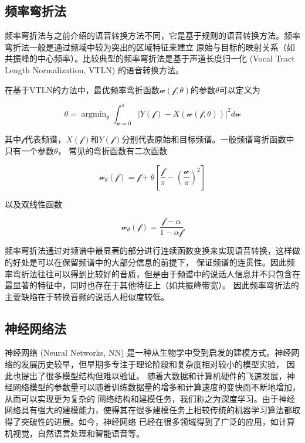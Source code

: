 \subsection{频率弯折法}
频率弯折法与之前介绍的语音转换方法不同，它是基于规则的语音转换方法。频率弯折法一般是通过频域中较为突出的区域特征来建立
原始与目标的映射关系（如共振峰的中心频率）。比较典型的频率弯折法是基于声道长度归一化 (Vocal Tract Length Normalization, VTLN) 的语音转换方法。

在基于VTLN的方法中，最优频率弯折函数$\mathcal{w}(\mathcal{f}, \theta)$的参数$\theta$可以定义为

\begin{equation}
    \theta = \mathop{\arg\min}_{\theta}\int^{\pi}_{\mathcal{w}=0}\left| Y(\mathcal{f})-X(\mathcal{w}(\mathcal{f},\theta)) \right|^2 d\mathcal{w}
\end{equation}

其中$\mathcal{f}$代表频谱，$X(\mathcal{f})$和$Y(\mathcal{f})$分别代表原始和目标频谱。一般频谱弯折函数中只有一个参数$\theta$，
常见的弯折函数有二次函数

\begin{equation}
    \mathcal{w}_{\theta}(\mathcal{f}) = \mathcal{f} + \theta\left[ \frac{\mathcal{f}}{\pi}-(\frac{\mathcal{w}}{\pi})^2 \right]  
\end{equation}

以及双线性函数

\begin{equation}
    \mathcal{w}_{\theta}(\mathcal{f}) = \frac{\mathcal{f}-\alpha}{1-\alpha \mathcal{f}}
\end{equation}

频率弯折法通过对频谱中最显著的部分进行连续函数变换来实现语音转换，这样做的好处是可以在保留频谱中的大部分信息的前提下，
保证频谱的连贯性。因此频率弯折法往往可以得到比较好的音质，但是由于频谱中的说话人信息并不只包含在最显著的特征中，同时也存在于其他特征上（如共振峰带宽）。
因此频率弯折法的主要缺陷在于转换音频的说话人相似度较低。

\subsection{神经网络法}
神经网络 (Neural Networks, NN) 是一种从生物学中受到启发的建模方式。神经网络的发展历史较早，但早期多专注于理论阶段和复杂度相对较小的模型实验，
因此也提出了很多模型结构但难以验证。
随着大数据和计算机硬件的飞速发展，神经网络模型的参数量可以随着训练数据量的增多和计算速度的变快而不断地增加，从而可以实现更为复杂的
网络结构和建模任务，我们称之为深度学习。由于神经网络具有强大的建模能力，使得其在很多建模任务上相较传统的机器学习算法都取得了突破性的进展。如今，神经网络
已经在很多领域得到了广泛的应用，如计算机视觉，自然语言处理和智能语音等。

